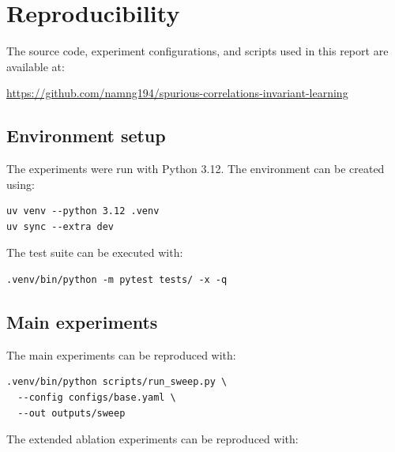 \documentclass[12pt,a4paper]{article}
\begin{document}
\clearpage
{}



\appendix
\clearpage
\section{Reproducibility}
\setlength{\parskip}{2pt}
\titlespacing*{\subsection}{0pt}{8pt}{4pt}
\setlength{\parskip}{0pt}

The source code, experiment configurations, and scripts used in this report are
available at:

\begin{center}
\url{https://github.com/namng194/spurious-correlations-invariant-learning}
\end{center}

\subsection{Environment setup}
The experiments were run with Python 3.12. The environment can be created using:

\begin{verbatim}
uv venv --python 3.12 .venv
uv sync --extra dev
\end{verbatim}

The test suite can be executed with:

\begin{verbatim}
.venv/bin/python -m pytest tests/ -x -q
\end{verbatim}

\subsection{Main experiments}
The main experiments can be reproduced with:

\begin{verbatim}
.venv/bin/python scripts/run_sweep.py \
  --config configs/base.yaml \
  --out outputs/sweep
\end{verbatim}

The extended ablation experiments can be reproduced with:
\end{document}

